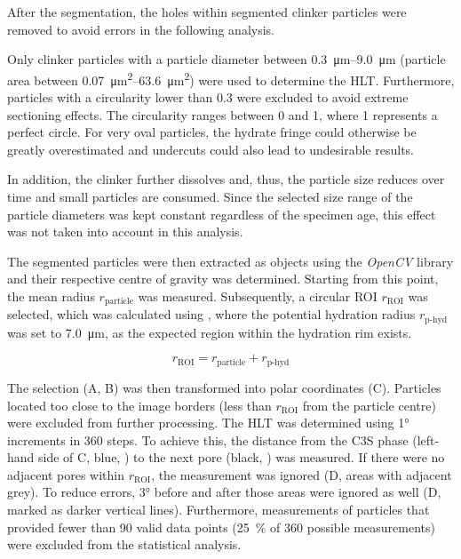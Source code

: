 After the segmentation, the holes within segmented clinker particles were removed to avoid errors in the following analysis.

Only clinker particles with a particle diameter between \qtyrange{0.3}{9.0}{\micro\meter} (particle area between \qtyrange{0.07}{63.6}{\square\micro\meter}) were used to determine the \ac{HLT}.
Furthermore, particles with a circularity lower than \num{0.3} were excluded to avoid extreme sectioning effects.
The circularity ranges between \num{0} and \num{1}, where \num{1} represents a perfect circle.
For very oval particles, the hydrate fringe could otherwise be greatly overestimated and undercuts could also lead to undesirable results.

In addition, the clinker further dissolves and, thus, the particle size reduces over time and small particles are consumed.
Since the selected size range of the particle diameters was kept constant regardless of the specimen age, this effect was not taken into account in this analysis. %

The segmented particles were then extracted as objects using the \textit{OpenCV} \cite{bradski.2000} library and their respective centre of gravity was determined.
Starting from this point, the mean radius $r_\text{particle}$ was measured.
Subsequently, a circular \ac{ROI} $r_\text{ROI}$ was selected, which was calculated using , where the potential hydration radius $r_\text{p-hyd}$ was set to \qty{7.0}{\micro\meter}, as the expected region within the hydration rim exists.

\begin{equation}
	\label{eq:r-roi}
	r_\text{ROI} = r_\text{particle} + r_\text{p-hyd}
\end{equation}

The selection (A, B) was then transformed into polar coordinates (C).
Particles located too close to the image borders (less than $r_\text{ROI}$ from the particle centre) were excluded from further processing.
The \ac{HLT} was determined using \ang{1} increments in \num{360} steps.
To achieve this, the distance from the \ac{C3S} phase (left-hand side of C, blue, ) to the next pore (black, ) was measured.
If there were no adjacent pores within $r_\text{ROI}$, the measurement was ignored (D, areas with adjacent grey).
To reduce errors, \ang{3} before and after those areas were ignored as well (D, marked as darker vertical lines).
Furthermore, measurements of particles that provided fewer than \num{90} valid data points (\qty{25}{\percent} of \num{360} possible measurements) were excluded from the statistical analysis.

